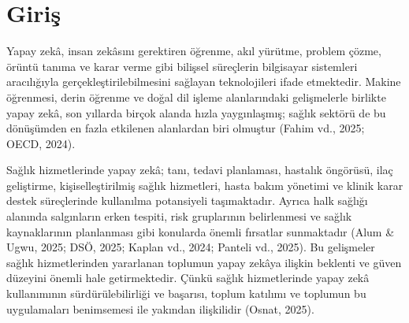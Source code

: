 %

\section{Giriş}

Yapay zekâ, insan zekâsını gerektiren öğrenme, akıl yürütme, problem çözme,
örüntü tanıma ve karar verme gibi bilişsel süreçlerin bilgisayar sistemleri
aracılığıyla gerçekleştirilebilmesini sağlayan teknolojileri ifade etmektedir.
Makine öğrenmesi, derin öğrenme ve doğal dil işleme alanlarındaki
gelişmelerle birlikte yapay zekâ, son yıllarda birçok alanda hızla
yaygınlaşmış; sağlık sektörü de bu dönüşümden en fazla etkilenen alanlardan
biri olmuştur (Fahim vd., 2025; OECD, 2024).

Sağlık hizmetlerinde yapay zekâ; tanı, tedavi planlaması, hastalık öngörüsü,
ilaç geliştirme, kişiselleştirilmiş sağlık hizmetleri, hasta bakım yönetimi ve
klinik karar destek süreçlerinde kullanılma potansiyeli taşımaktadır. Ayrıca
halk sağlığı alanında salgınların erken tespiti, risk gruplarının belirlenmesi
ve sağlık kaynaklarının planlanması gibi konularda önemli fırsatlar sunmaktadır
(Alum \& Ugwu, 2025; DSÖ, 2025; Kaplan vd., 2024; Panteli vd., 2025). Bu
gelişmeler sağlık hizmetlerinden yararlanan toplumun yapay zekâya ilişkin
beklenti ve güven düzeyini önemli hale getirmektedir. Çünkü sağlık
hizmetlerinde yapay zekâ kullanımının sürdürülebilirliği ve başarısı, toplum
katılımı ve toplumun bu uygulamaları benimsemesi ile yakından ilişkilidir
(Osnat, 2025).

